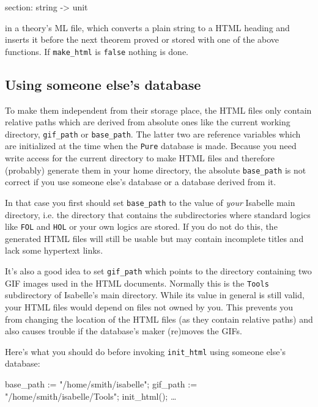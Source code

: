 \begin{ttbox}
section: string -> unit
\end{ttbox}

in a theory's ML file, which converts a plain string to a HTML
heading and inserts it before the next theorem proved or stored with
one of the above functions. If {\tt make_html} is {\tt false} nothing
is done.


\subsection*{Using someone else's database}

To make them independent from their storage place, the HTML files only
contain relative paths which are derived from absolute ones like the
current working directory, {\tt gif_path} or {\tt base_path}. The
latter two are reference variables which are initialized at the time
when the {\tt Pure} database is made. Because you need write access
for the current directory to make HTML files and therefore (probably)
generate them in your home directory, the absolute {\tt base_path} is
not correct if you use someone else's database or a database derived
from it.

In that case you first should set {\tt base_path} to the value of {\em
your} Isabelle main directory, i.e. the directory that contains the
subdirectories where standard logics like {\tt FOL} and {\tt HOL} or
your own logics are stored. If you do not do this, the generated HTML
files will still be usable but may contain incomplete titles and lack
some hypertext links.

It's also a good idea to set {\tt gif_path} which points to the
directory containing two GIF images used in the HTML
documents. Normally this is the {\tt Tools} subdirectory of Isabelle's
main directory. While its value in general is still valid, your HTML
files would depend on files not owned by you. This prevents you from
changing the location of the HTML files (as they contain relative
paths) and also causes trouble if the database's maker (re)moves the
GIFs.

Here's what you should do before invoking {\tt init_html} using
someone else's \ML{} database:

\begin{ttbox}
base_path := "/home/smith/isabelle";
gif_path := "/home/smith/isabelle/Tools";
init_html();
\dots
\end{ttbox}

